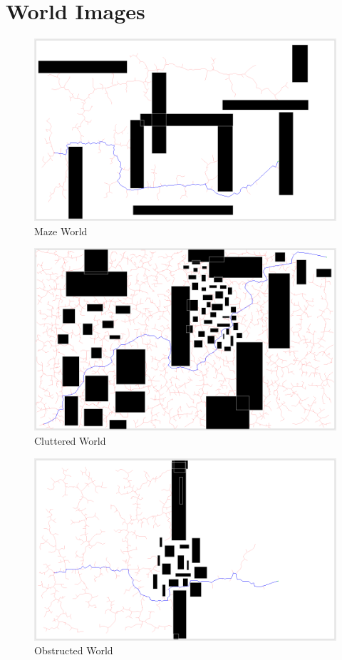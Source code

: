\documentclass[10pt,twoside,twocolumn]{article}
\begin{document}
\section{World Images}
\begin{figure}[h]
\begin{center}
\includegraphics[scale=0.20]{paper_world.png}
\end{center}
\caption{Maze World}
\end{figure}
\begin{figure}[h]
\begin{center}
\includegraphics[scale=0.2]{cluttered_world.png}
\end{center}
\caption{Cluttered World}
\end{figure}
\begin{figure}[h]
\begin{center}
\includegraphics[scale=0.2]{prop_world.png}
\end{center}
\caption{Obstructed World}
\end{figure}
\end{document}

